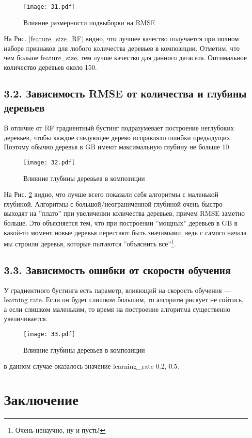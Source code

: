 \documentclass[12pt,fleqn]{article}
\begin{document}
\begin{figure}[htb]
    \centering
    \texttt{[image: 31.pdf]}
    \caption{Влияние размерности подвыборки на RMSE}
    \label{feature_size_GB}
\end{figure}

На Рис. \ref{feature_size_RF} видно, что лучшее качество получается
при полном наборе признаков для любого количества деревьев в композиции.
Отметим, что чем больше feature\_size, тем лучше качество для данного датасета.
Оптимальное количество деревьев около 150.

\subsection{3.2. Зависимость RMSE от количества и глубины деревьев}

В отличие от RF градиентный бустинг подразумевает построение неглубоких деревьев, чтобы 
каждое следующее дерево исправляло ошибки предыдущих. Поэтому обычно деревья в GB имеют максимальную 
глубину не больше 10.

\begin{figure}[htb]
    \centering
    \texttt{[image: 32.pdf]}
    \caption{Влияние глубины деревьев в композиции}
    \label{depth_GB}
\end{figure}

На Рис. \ref{depth_GB} видно, что лучше всего показали себя алгоритмы с маленькой глубиной.
Алгоритмы с большой/неограниченной глубиной очень быстро выходят на ''плато'' при увеличении количества 
деревьев, причем RMSE заметно больше. Это объясняется тем, что при построении ''мощных''
деревьев в GB в какой-то момент новые деревья перестают быть значимыми, ведь с самого начала 
мы строили деревья, которые пытаются ''объяснить все''\footnote{Очень ненаучно, ну и пусть!}.

\newpage

\subsection{3.3. Зависимость ошибки от скорости обучения}
У градиентного бустинга есть параметр, влияющий на скорость обучения --- learning rate.
Если он будет слишком большим, то алгоритм рискует не сойтись, а если слишком маленьким,
то время на построение алгоритма существенно увеличивается.

\begin{figure}[htb]
    \centering
    \texttt{[image: 33.pdf]}
    \caption{Влияние глубины деревьев в композиции}
    \label{rate_GB}
\end{figure}

 в данном случае оказалось значение learning\_rate 0.2, 0.5.
\section{Заключение}
\end{document}
